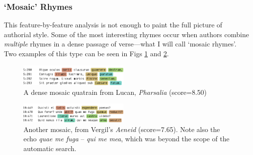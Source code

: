 \documentclass[twocolumn, switch]{article} %
\begin{document}
\subsubsection{`Mosaic' Rhymes}
\label{sec:mosaic}

This feature-by-feature analysis is not enough to paint the full picture of
authorial style. Some of the most interesting rhymes occur when authors
combine \emph{multiple} rhymes in a dense passage of verse---what I will call
`mosaic rhymes'. Two examples of this type can be seen in Figs
\ref{fig:mosaic_phars} and \ref{fig:mosaic_aen}.

\begin{figure}[h]
    \caption{A dense mosaic quatrain from Lucan, \emph{Pharsalia} (score=8.50)}
    \label{fig:mosaic_phars}
    \centering
    \includegraphics[width=0.48\textwidth]{phar_mosaic.pdf}
\end{figure}

\begin{figure}[h]
    \caption{Another mosaic, from Vergil's \emph{Aeneid} (score=7.65). Note also the echo \emph{quae me fuga} -- \emph{qui me mea}, which was beyond the scope of the automatic search.}
    \label{fig:mosaic_aen}
    \centering
    \includegraphics[width=0.48\textwidth]{aen_mosaic.pdf}
\end{figure}
\end{document}
